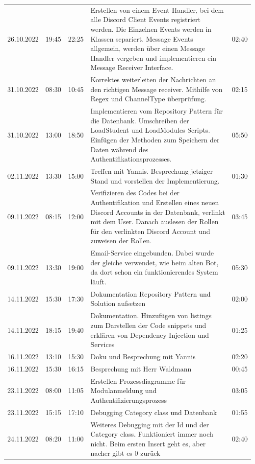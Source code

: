 \documentclass[a4paper, table]{article}
\begin{document}
\begin{longtable}[h]{|l|l|l|p{20em}|l|}
    26.10.2022 & 19:45 & 22:25 & Erstellen von einem Event Handler, bei dem alle   Discord Client Events registriert werden. Die Einzelnen Events werden in   Klassen separiert. Message Events allgemein, werden über einen Message   Handler vergeben und implementieren ein Message Receiver Interface. & 02:40 \\
    31.10.2022 & 08:30 & 10:45 & Korrektes weiterleiten der Nachrichten an den   richtigen Message receiver. Mithilfe von Regex und ChannelType überprüfung. & 02:15  \\
    31.10.2022 & 13:00 & 18:50 & Implementieren vom Repository Pattern für die   Datenbank. Umschreiben der LoadStudent und LoadModules Scripts. Einfügen der   Methoden zum Speichern der Daten während des Authentifikationsprozesses. & 05:50  \\
    02.11.2022 & 13:30 & 15:00 & Treffen mit Yannis. Besprechung jetziger Stand   und vorstellen der Implementierung. & 01:30  \\
    09.11.2022 & 08:15 & 12:00 & Verifizieren des Codes bei der Authentifikation   und Erstellen eines neuen Discord Accounts in der Datenbank, verlinkt mit dem   User. Danach auslesen der Rollen für den verlinkten Discord Account und   zuweisen der Rollen. & 03:45  \\
    09.11.2022 & 13:30 & 19:00 & Email-Service eingebunden. Dabei wurde der   gleiche verwendet, wie beim alten Bot, da dort schon ein funktionierendes   System läuft. & 05:30 \\
    14.11.2022 & 15:30 & 17:30 & Dokumentation Repository Pattern und Solution   aufsetzen & 02:00  \\
    14.11.2022 & 18:15 & 19:40 & Dokumentation. Hinzufügen von listings zum   Darstellen der Code snippets und erklären von Dependency Injection und   Services & 01:25 \\
    16.11.2022 & 13:10 & 15:30 & Doku und Besprechung mit Yannis & 02:20 \\
    16.11.2022 & 15:30 & 16:15 & Besprechung mit Herr   Waldmann & 00:45  \\
    23.11.2022 & 08:00 & 11:05 & Erstellen Prozessdiagramme für Modulanmeldung und   Authentifizierungsprozess & 03:05  \\
    23.11.2022 & 15:15 & 17:10 & Debugging Category class   und Datenbank & 01:55  \\
    24.11.2022 & 08:20 & 11:00 & Weiteres Debugging mit der Id und der Category   class. Funktioniert immer noch nicht. Beim ersten Insert geht es, aber nacher   gibt es 0 zurück & 02:40\\

\end{longtable}
\end{document}
